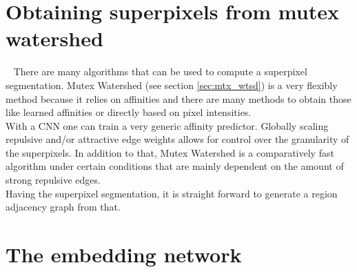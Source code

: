 \section{Obtaining superpixels from mutex watershed}~\label{seg:pip_mutex}
There are many algorithms that can be used to compute a superpixel segmentation. Mutex Watershed (see section \ref{sec:mtx_wtsd}) is a very flexibly method because it relies on affinities and there are many methods to obtain those like learned affinities or directly based on pixel intensities.\\
With a CNN one can train a very generic affinity predictor. Globally scaling repulsive and/or attractive edge weights allows for control over the granularity of the superpixels. In addition to that, Mutex Watershed is a comparatively fast algorithm under certain conditions that are mainly dependent on the amount of strong repulsive edges.\\
Having the superpixel segmentation, it is straight forward to generate a region adjacency graph from that.

\section{The embedding network}~\label{seg:pip_embed}

